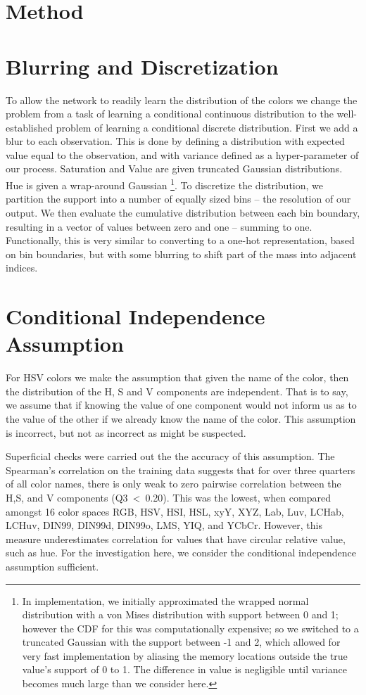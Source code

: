 \documentclass[11pt,letterpaper]{article}
\begin{document}
\section{Method}

\section{Blurring and Discretization}
To allow the network to readily learn the distribution of the colors we change the problem from a task of learning a conditional continuous distribution to the well-established problem of learning a conditional discrete distribution.
First we add a blur to each observation.
This is done by defining a distribution with expected value equal to the observation,
and with variance defined as a hyper-parameter of our process.
Saturation and Value are given truncated Gaussian distributions.
Hue is given a wrap-around Gaussian \footnote{In implementation, we initially approximated the wrapped normal distribution with a von Mises distribution with support between 0 and 1; however the CDF for this was computationally expensive; so we switched to a truncated Gaussian with the support between -1 and 2, which allowed for very fast implementation by aliasing the memory locations outside the true value's support of 0 to 1. The difference in value is negligible until variance becomes much large than we consider here.}.
To discretize the distribution, we partition the support into a number of equally sized bins -- the resolution of our output.
We then evaluate the cumulative distribution between each bin boundary, resulting in a vector of values between zero and one -- summing to one.
Functionally, this is very similar to converting to a one-hot representation, based on bin boundaries, but with some blurring to shift part of the mass into adjacent indices.



\section{Conditional Independence Assumption}
For HSV colors we make the assumption that given the name of the color, then the distribution of the H, S and V components are independent.
That is to say, we assume that if knowing the value of one component would not inform us as to the value of the other if we already know the name of the color.
This assumption is incorrect, but not as incorrect as might be suspected.

Superficial checks were carried out the the accuracy of this assumption.
The Spearman's correlation on the training data suggests that for over three quarters of all color names, there is only weak to zero pairwise correlation between the H,S, and V components (\mbox{Q3 < 0.20}).
This was the lowest, when compared amongst 16 color spaces RGB, HSV, HSI, HSL, xyY, XYZ, Lab, Luv, LCHab, LCHuv, DIN99, DIN99d, DIN99o, LMS, YIQ, and YCbCr.
However, this measure underestimates correlation for values that have circular relative value, such as hue.
For the investigation here, we consider the conditional independence assumption sufficient.
\end{document}
